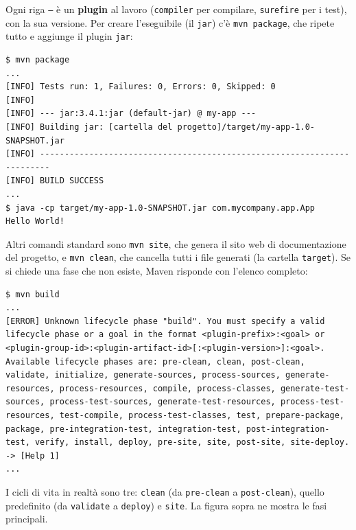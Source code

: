Ogni riga \texttt{---} è un \textbf{plugin} al lavoro (\texttt{compiler} per compilare, \texttt{surefire} per i test),
con la sua versione. Per creare l'eseguibile (il \texttt{jar}) c'è \texttt{mvn package}, che ripete tutto e aggiunge il
plugin \texttt{jar}:

\begin{lstlisting}[style=shell, name=Terminale]
$ mvn package
...
[INFO] Tests run: 1, Failures: 0, Errors: 0, Skipped: 0
[INFO]
[INFO] --- jar:3.4.1:jar (default-jar) @ my-app ---
[INFO] Building jar: [cartella del progetto]/target/my-app-1.0-SNAPSHOT.jar
[INFO] ------------------------------------------------------------------------
[INFO] BUILD SUCCESS
...
$ java -cp target/my-app-1.0-SNAPSHOT.jar com.mycompany.app.App
Hello World!
\end{lstlisting}

Altri comandi standard sono \texttt{mvn site}, che genera il sito web di documentazione del progetto, e \texttt{mvn
clean}, che cancella tutti i file generati (la cartella \texttt{target}). Se si chiede una fase che non esiste, Maven
risponde con l'elenco completo:

\begin{lstlisting}[style=shell, name=Terminale]
$ mvn build
...
[ERROR] Unknown lifecycle phase "build". You must specify a valid lifecycle phase or a goal in the format <plugin-prefix>:<goal> or <plugin-group-id>:<plugin-artifact-id>[:<plugin-version>]:<goal>. Available lifecycle phases are: pre-clean, clean, post-clean, validate, initialize, generate-sources, process-sources, generate-resources, process-resources, compile, process-classes, generate-test-sources, process-test-sources, generate-test-resources, process-test-resources, test-compile, process-test-classes, test, prepare-package, package, pre-integration-test, integration-test, post-integration-test, verify, install, deploy, pre-site, site, post-site, site-deploy. -> [Help 1]
...
\end{lstlisting}

I cicli di vita in realtà sono tre: \texttt{clean} (da \texttt{pre-clean} a \texttt{post-clean}), quello predefinito
(da \texttt{validate} a \texttt{deploy}) e \texttt{site}. La figura sopra ne mostra le fasi principali.

